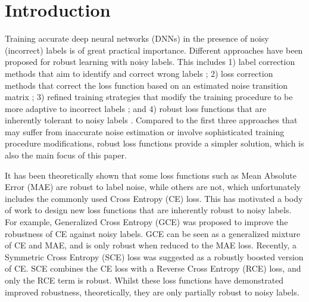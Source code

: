 \documentclass{article}
\begin{document}
\section{Introduction}
\label{sec:intro}
Training accurate deep neural networks (DNNs) in the presence of noisy (incorrect) labels is of great practical importance. Different approaches have been proposed for robust learning with noisy labels. This includes 1) label correction methods that aim to identify and correct wrong labels \cite{xiao2015learning,vahdat2017toward,veit2017learning,li2017learning}; 2) loss correction methods that correct the loss function based on an estimated noise transition matrix \cite{sukhbaatar2014training,reed2014training,patrini2017making,han2018masking}; 3) refined training strategies that modify the training procedure to be more adaptive to incorrect labels \cite{jiang2018mentornet,wang2018iterative,tanaka2018joint,ma2018dimensionality,han2018co}; and 4) robust loss functions that are inherently tolerant to noisy labels \cite{ghosh2017robust,zhang2018generalized,wang2019symmetric}. Compared to the first three approaches that may suffer from inaccurate noise estimation or involve sophisticated training procedure modifications, robust loss functions provide a simpler solution, which is also the main focus of this paper.

It has been theoretically shown that some loss functions such as Mean Absolute Error (MAE) are robust to label noise, while others are not, which unfortunately includes the commonly used Cross Entropy (CE) loss. 
This has motivated a body of work to design new loss functions that are inherently robust to noisy labels.
For example, Generalized Cross Entropy (GCE) \cite{zhang2018generalized} was proposed to improve the robustness of CE against noisy labels. GCE can be seen as a generalized mixture of CE and MAE, and is only robust when reduced to the MAE loss. Recently, a Symmetric Cross Entropy (SCE) \cite{wang2019symmetric} loss was suggested as a robustly boosted version of CE. SCE combines the CE loss with a Reverse Cross Entropy (RCE) loss, and only the RCE term is robust.
Whilst these loss functions have demonstrated improved robustness, theoretically, they are only partially robust to noisy labels.
\end{document}
